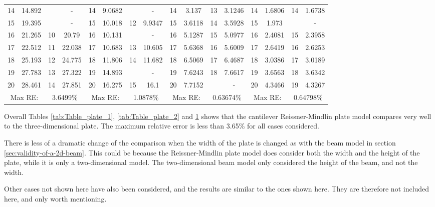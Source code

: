 \documentclass[../../main.tex]{subfiles}
\begin{document}
\begin{table}[htbp]
{{\begin{tabular}{|cccc||cccc||cccc||cccc|}
			14 & 14.892 &  & - & 14 & 9.0682 & & - & 14 & 3.137 & 13 & 3.1246 & 14 & 1.6806 & 14 & 1.6738\\
			15 & 19.395 &  & - & 15 & 10.018 & 12 & 9.9347 & 15 & 3.6118 & 14 & 3.5928 & 15 & 1.973 &  & -\\
			16 & 21.265 & 10 & 20.79 & 16 & 10.131 &  & - & 16 & 5.1287 & 15 & 5.0977 & 16 & 2.4081 & 15 & 2.3958\\
			17 & 22.512 & 11 & 22.038 & 17 & 10.683 & 13 & 10.605 & 17 & 5.6368 & 16 & 5.6009 & 17 & 2.6419 & 16 & 2.6253\\
			18 & 25.193 & 12 & 24.775 & 18 & 11.806 & 14 & 11.682 & 18 & 6.5069 & 17 & 6.4687 & 18 & 3.0386 & 17 & 3.0189\\
			19 & 27.783 & 13 & 27.322 & 19 & 14.893 &  & - & 19 & 7.6243 & 18 & 7.6617 & 19 & 3.6563 & 18 & 3.6342\\
			20 & 28.461 & 14 & 27.851 & 20 & 16.275 & 15 & 16.1 & 20 & 7.7152 &  & - & 20 & 4.3466 & 19 & 4.3267\\
			\hline
			\multicolumn{2}{|c}{Max RE:} & \multicolumn{2}{c||}{3.6499\%} & \multicolumn{2}{c}{Max RE:} & \multicolumn{2}{c||}{1.0878\%} & \multicolumn{2}{c}{Max RE:} & \multicolumn{2}{c||}{0.63674\%} & \multicolumn{2}{c}{Max RE:} & \multicolumn{2}{c|}{0.64798\%} \\
			\hline
		\end{tabular}
		\label{tab:Table_plate_3}
	}}
\end{table}
\FloatBarrier

Overall Tables \ref{tab:Table_plate_1}, \ref{tab:Table_plate_2} and \ref{tab:Table_plate_3} shows that the cantilever Reissner-Mindlin plate model compares very well to the three-dimensional plate. The maximum relative error is less than 3.65\% for all cases considered.

There is less of a dramatic change of the comparison when the width of the plate is changed as with the beam model in section \ref{sec:validity-of-a-2d-beam}. This could be because the Reissner-Mindlin plate model does consider both the width and the height of the plate, while it is only a two-dimensional model. The two-dimensional beam model only considered the height of the beam, and not the width.

Other cases not shown here have also been considered, and the results are similar to the ones shown here. They are therefore not included here, and only worth mentioning.
\end{document}
